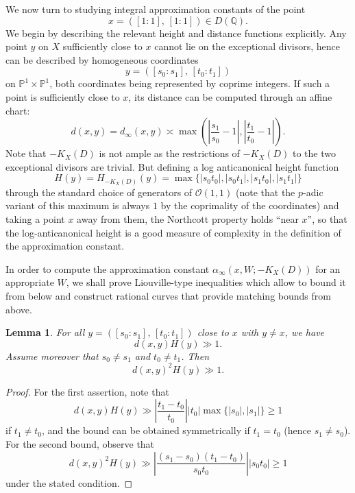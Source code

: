 \documentclass[a4paper, twoside, 11pt]{amsart}
\newtheorem{lemma}[theorem]{Lemma}
\theoremstyle{definition}
\newcommand{\cO}{\mathcal{O}}
\newcommand{\PP}{\mathbb{P}}
\newcommand{\QQ}{\mathbb{Q}}
\begin{document}
We now turn to studying integral approximation constants of the point
	\begin{equation*}
		x=([1:1],\,[1:1])\in D(\QQ).
	\end{equation*}
	We begin by describing the relevant height and distance functions explicitly. Any point $y$ on $X$ sufficiently close to $x$ cannot lie on the exceptional divisors, hence can be described by homogeneous coordinates
	\begin{equation*}
		y = ([s_0:s_1],\,[t_0:t_1])
	\end{equation*}
	on $\PP^1\times \PP^1$, both coordinates being represented by coprime integers. If such a point is sufficiently close to $x$, its distance can be computed through an affine chart:
	\begin{equation*}
		d(x,y) = d_\infty(x,y)\asymp \max\left(\left|\frac{s_1}{s_0}-1\right|,\left|\frac{t_1}{t_0}-1\right|\right).
	\end{equation*}
    Note that $-K_X(D)$ is not ample as the restrictions of $-K_X(D)$ to the two exceptional divisors are trivial. But defining a log anticanonical height function 
	\begin{equation*}
		H(y)=H_{-K_X(D)}(y)=\max\{|s_0t_0|,|s_0t_1|,|s_1t_0|,|s_1t_1|\}
	\end{equation*}
	through the standard choice of generators of $\cO(1,1)$
	(note that the $p$-adic variant of this maximum is always $1$ by the coprimality of the coordinates) and taking a point $x$ away from them, the Northcott property holds ``near $x$'', so that the log-anticanonical height is a good measure  of complexity in the definition of the approximation constant.
	

	In order to compute the approximation constant $\alpha_\infty(x,W;-K_X(D))$ for an appropriate $W$, we shall prove Liouville-type inequalities which allow to bound it from below and construct rational curves that provide matching bounds from above.
\begin{lemma}\label{lem:liouville-example}
	For all $y = ([s_0:s_1],\,[t_0:t_1])$ close to $x$ with $y\ne x$, we have 
	\begin{equation*}
		d(x,y)H(y)\gg 1.
	\end{equation*}
	Assume moreover that $s_0\neq s_1$ and $t_0\neq t_1$. Then 
	\begin{equation*}
		d(x,y)^2H(y)\gg 1.
	\end{equation*}
\end{lemma}
\begin{proof}
	For the first assertion, note that 
	\begin{equation*}
		d(x,y)H(y) \gg \left|\frac{t_1-t_0}{t_0}\right| |t_0|\max\{|s_0|,|s_1|\} \ge 1
	\end{equation*}
	if $t_1\ne t_0$, and the bound can be obtained symmetrically if $t_1=t_0$ (hence $s_1\ne s_0$).
	For the second bound, observe that
	\begin{equation*}
		d(x,y)^2H(y)\gg \left|\frac{(s_1-s_0)(t_1-t_0)}{s_0t_0}\right| |s_0t_0| \ge 1
	\end{equation*}
	under the stated condition.
\end{proof}
\end{document}
